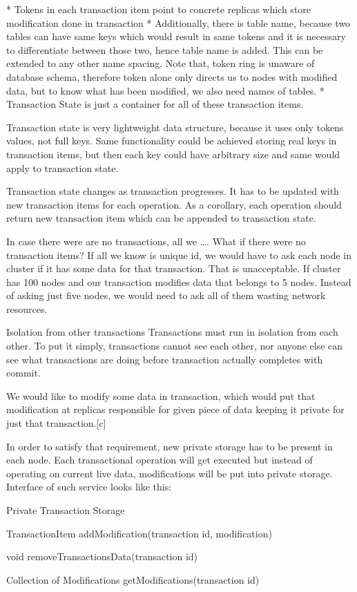 * Tokens in each transaction item point to concrete replicas which store modification done in transaction
* Additionally, there is table name, because two tables can have same keys which would result in same tokens and it is necessary to differentiate between those two, hence table name is added. This can be extended to any other name spacing. Note that, token ring is unaware of database schema, therefore token alone only directs us to nodes with modified data, but to know what has been modified, we also need names of tables.
* Transaction State is just a container for all of these transaction items.


Transaction state is very lightweight data structure, because it uses only tokens values, not full keys. Same functionality could be achieved storing real keys in transaction items, but then each key could have arbitrary size and same would apply to transaction state.


Transaction state changes as transaction progresses. It has to be updated with new transaction items for each operation. As a corollary, each operation should return new transaction item which can be appended to transaction state. 


In case there were are no transactions, all we ….
What if there were no transaction items? If all we know is unique id, we would have to ask each node in cluster if it has some data for that transaction. That is unacceptable. If cluster has 100 nodes and our transaction modifies data that belongs to 5 nodes. Instead of asking just five nodes, we would need to ask all of them wasting network resources.


Isolation from other transactions
Transactions must run in isolation from each other. To put it simply, transactions cannot see each other, nor anyone else can see what transactions are doing before transaction actually completes with commit.


We would like to modify some data in transaction, which would put that modification at replicas responsible for given piece of data keeping it private for just that transaction.[c]


In order to satisfy that requirement, new private storage has to be present in each node.
Each transactional operation will get executed but instead of operating on current live data, modifications will be put into private storage. Interface of such service looks like this:


Private Transaction Storage {
        TransactionItem addModification(transaction id, modification)


        void removeTransactionsData(transaction id)


          Collection of Modifications getModifications(transaction id)        
}


